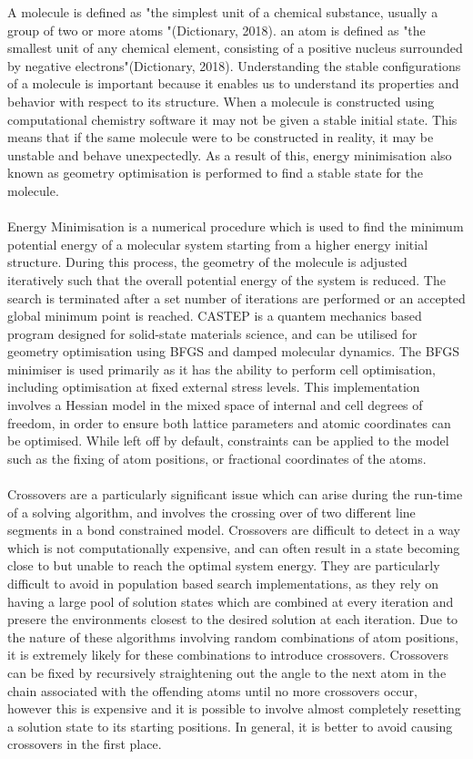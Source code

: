 \documentclass[9pt]{article}
\begin{document}
A molecule is defined as "the simplest unit of a chemical substance, usually a group of two or more atoms "(Dictionary, 2018). an atom is defined as "the smallest unit of any chemical element, consisting of a positive nucleus surrounded by negative electrons"(Dictionary, 2018). Understanding the stable configurations of a molecule is important because it enables us to understand its properties and behavior with respect to its structure. When a molecule is constructed using computational chemistry software it may not be given a stable initial state. This means that if the same molecule were to be constructed in reality, it may be unstable and behave unexpectedly. As a result of this, energy minimisation also known as geometry optimisation is performed to find a stable  state for the molecule.
\\
\\
Energy Minimisation is a numerical procedure which is used to find the minimum potential energy of a molecular system starting from a higher energy initial structure. During this process, the geometry of the molecule is adjusted iteratively such that the overall potential energy of the system is reduced. The search is terminated after a set number of iterations are performed or an accepted global minimum point is reached. CASTEP is a quantem mechanics based program designed for solid-state materials science, and can be utilised for geometry optimisation using BFGS and damped molecular dynamics. The BFGS minimiser is used primarily as it has the ability to perform cell optimisation, including optimisation at fixed external stress levels. This implementation involves a Hessian model in the mixed space of internal and cell degrees of freedom, in order to ensure both lattice parameters and atomic coordinates can be optimised. While left off by default, constraints can be applied to the model such as the fixing of atom positions, or fractional coordinates of the atoms.
\\
\\
Crossovers are a particularly significant issue which can arise during the run-time of a solving algorithm, and involves the crossing over of two different line segments in a bond constrained model. Crossovers are difficult to detect in a way which is not computationally expensive, and can often result in a state becoming close to but unable to reach the optimal system energy. They are particularly difficult to avoid in population based search implementations, as they rely on having a large pool of solution states which are combined at every iteration and presere the environments closest to the desired solution at each iteration. Due to the nature of these algorithms involving random combinations of atom positions, it is extremely likely for these combinations to introduce crossovers. Crossovers can be fixed by recursively straightening out the angle to the next atom in the chain associated with the offending atoms until no more crossovers occur, however this is expensive and it is possible to involve almost completely resetting a solution state to its starting positions. In general, it is better to avoid causing crossovers in the first place. 
\end{document}
